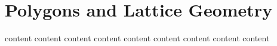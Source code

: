 \chapter{Polygons and Lattice Geometry}
\label{ch:polygons_lattice}
{content}
{content}
{content}
{content}
{content}
{content}
{content}
{content}
{content}